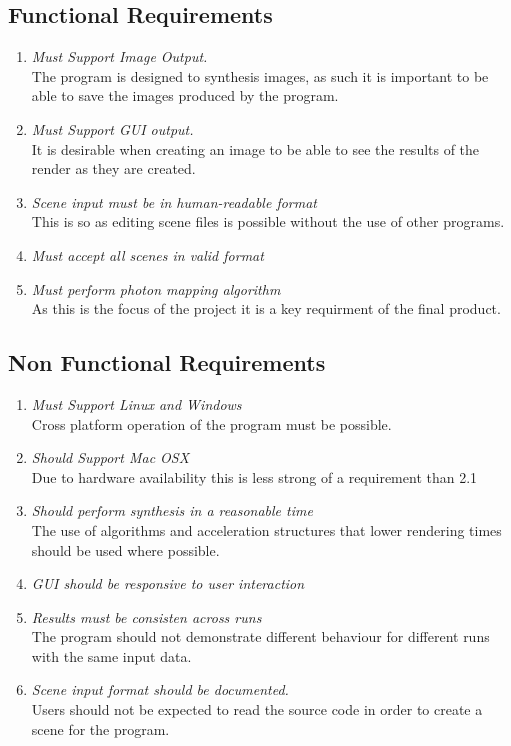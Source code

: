 \newcommand{\req}[2]
{
	\item {\it #1} \hfill \\ #2
}
  
\subsection{Functional Requirements}

\begin{enumerate}[{1}.1]
	\req{Must Support Image Output.}
	{
		The program is designed to synthesis images, as such it is important to be able to
		save the images produced by the program.
	}

	\req{Must Support GUI output.}
	{
		It is desirable when creating an image to be able to see the results of the render as they are created.
	}
	\req{Scene input must be in human-readable format}
	{
		This is so as editing scene files is possible without the use of other programs.
	}

	\req{Must accept all scenes in valid format}
	{
	}

	\req{Must perform photon mapping algorithm}
	{
		As this is the focus of the project it is a key requirment of the final product.
	}
\end{enumerate}

\subsection{Non Functional Requirements}

\begin{enumerate}[{2}.1]
	\req{Must Support Linux and Windows}
	{
		Cross platform operation of the program must be possible.
	}
	\req{Should Support Mac OSX}
	{
		Due to hardware availability this is less strong of a requirement than 2.1
	}
	\req{Should perform synthesis in a reasonable time}
	{
		The use of algorithms and acceleration structures that lower rendering times
		should be used where possible.
	}

	\req{GUI should be responsive to user interaction}{}
	\req{Results must be consisten across runs}
	{
		The program should not demonstrate different behaviour for different runs with
		the same input data.
	}
	\req{Scene input format should be documented.}
	{
		Users should not be expected to read the source code in order to create
		a scene for the program.
	}
\end{enumerate}

